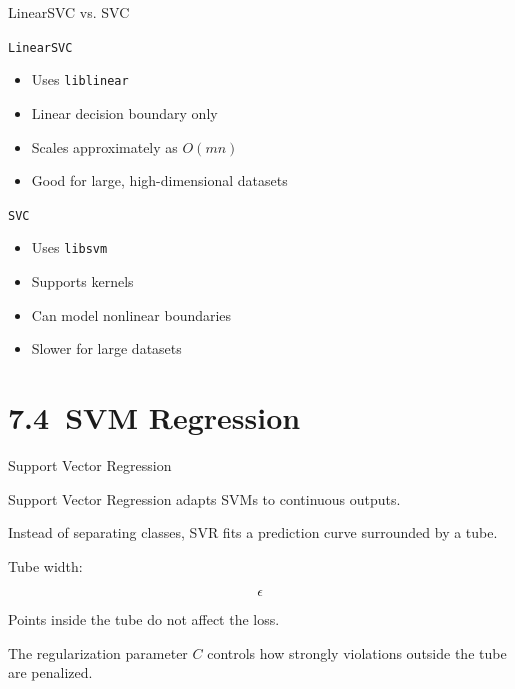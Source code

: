 \documentclass[aspectratio=169]{beamer}
\begin{document}

\begin{frame}{LinearSVC vs. SVC}

\texttt{LinearSVC}

\begin{itemize}
\item Uses \texttt{liblinear}
\item Linear decision boundary only
\item Scales approximately as \(O(mn)\)
\item Good for large, high-dimensional datasets
\end{itemize}

\vspace{0.5em}

\texttt{SVC}

\begin{itemize}
\item Uses \texttt{libsvm}
\item Supports kernels
\item Can model nonlinear boundaries
\item Slower for large datasets
\end{itemize}

\end{frame}


\section{7.4~SVM Regression}
\begin{frame}{Support Vector Regression}

Support Vector Regression adapts SVMs to continuous outputs.

\vspace{0.5em}

Instead of separating classes, SVR fits a prediction curve surrounded by a tube.

\vspace{0.5em}

Tube width:

\[
\epsilon
\]

\vspace{0.5em}

Points inside the tube do not affect the loss.

\vspace{0.5em}

The regularization parameter \(C\) controls how strongly violations outside the tube are penalized.

\end{frame}
\end{document}
